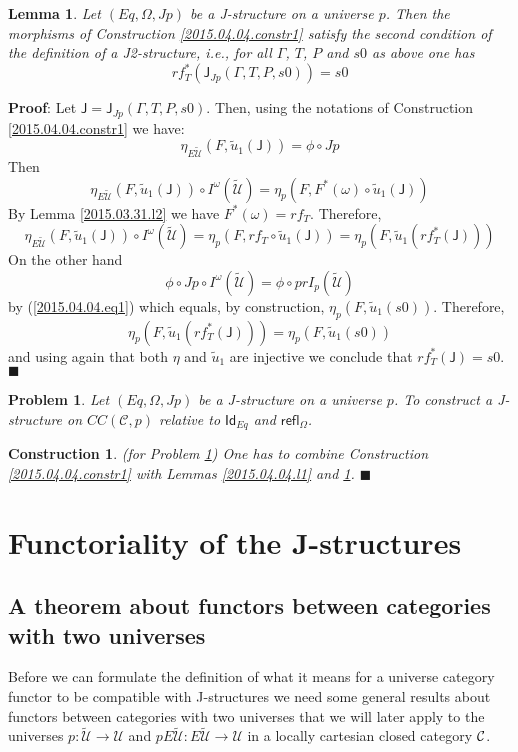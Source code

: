 \documentclass[12pt]{article}
\numberwithin{equation}{section}
\newenvironment{myproof}{{\bf Proof}:}{$\blacksquare$ \vskip 5mm }
\newtheorem{lemma}[proposition]{Lemma}
\newtheorem{problem}[proposition]{Problem}
\newtheorem{construction0}[proposition]{Construction}
\newenvironment{construction}[1]{\begin{construction0}(for Problem \ref{#1})}{$\blacksquare$ \end{construction0}}
\newcommand{\llabel}[1]{\label{#1}}
\newcommand{\sr}{\rightarrow}
\newcommand{\wt}{\widetilde}
\newcommand{\toCC}{CC} %
\newcommand{\Id}{\mathsf{Id}} %
\newcommand{\refl}{\mathsf{refl}}
\newcommand{\J}{\mathsf{J}}
\newcommand{\U}{\mathcal{U}}
\begin{document}
%
\begin{lemma}
\llabel{2015.04.04.l5} Let $(Eq,\Omega,Jp)$ be a J-structure on a universe
$p$. Then the morphisms of Construction \ref{2015.04.04.constr1} satisfy the
second condition of the definition of a J2-structure, i.e., for all $\Gamma$,
$T$, $P$ and $s0$ as above one has
%
$$rf_T^*(\J_{Jp}(\Gamma,T,P,s0))=s0$$
%
\end{lemma}
%
\begin{myproof}
Let $\J=\J_{Jp}(\Gamma,T,P,s0)$. Then, using the notations of Construction
\ref{2015.04.04.constr1} we have:
%
$$\eta_{E\wt{\U}}(F,\wt{u}_1(\J))=\phi\circ Jp$$
%
Then
%
$$\eta_{E\wt{\U}}(F,\wt{u}_1(\J))\circ
I^{\omega}(\wt{\U})=\eta_p(F,F^*(\omega)\circ \wt{u}_1(\J))$$
%
By Lemma \ref{2015.03.31.l2} we have $F^*(\omega)=rf_T$. Therefore,
%
$$\eta_{E\wt{\U}}(F,\wt{u}_1(\J))\circ I^{\omega}(\wt{\U})=\eta_p(F,rf_T\circ
\wt{u}_1(\J))=\eta_p(F,\wt{u}_1(rf_T^*(\J)))$$
%
On the other hand
%
$$\phi\circ Jp\circ I^{\omega}(\wt{\U})=\phi\circ prI_p(\wt{\U})$$
%
by (\ref{2015.04.04.eq1}) which equals, by construction,
$\eta_p(F,\wt{u}_1(s0))$. Therefore,
%
$$\eta_p(F,\wt{u}_1(rf_T^*(\J)))=\eta_p(F,\wt{u}_1(s0))$$
%
and using again that both $\eta$ and $\wt{u}_1$ are injective we conclude that
$rf_T^*(\J)=s0$.
\end{myproof}
%
\begin{problem}
\llabel{2015.04.04.prob2} Let $(Eq,\Omega,Jp)$ be a J-structure on a universe
$p$. To construct a J-structure on $\toCC({\mathcal C},p)$ relative to $\Id_{Eq}$
and $\refl_{\Omega}$.
\end{problem} 
%
\begin{construction}{2015.04.04.prob2}\rm
\llabel{2015.04.04.constr2} One has to combine Construction
\ref{2015.04.04.constr1} with Lemmas \ref{2015.04.04.l1} and
\ref{2015.04.04.l5}.
\end{construction}
%





\section{Functoriality of the J-structures}




\subsection{A theorem about functors between categories with two universes}
\llabel{twouniv}
%
Before we can formulate the definition of what it means for a universe category
functor to be compatible with J-structures we need some general results about
functors between categories with two universes that we will later apply to the
universes $p:\wt{\U}\sr \U$ and $pE\wt{\U}:E\wt{\U}\sr \U$ in a locally cartesian
closed category $\cal C$.
\end{document}

